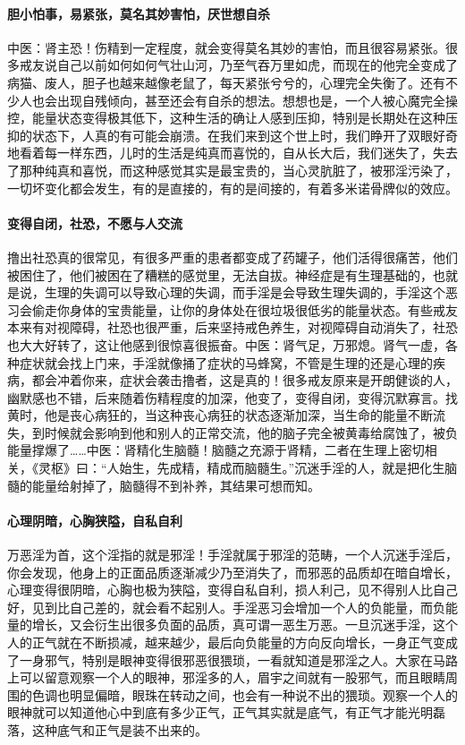 \paragraph{胆小怕事，易紧张，莫名其妙害怕，厌世想自杀}

中医：肾主恐！伤精到一定程度，就会变得莫名其妙的害怕，而且很容易紧张。很多戒友说自己以前如何如何气壮山河，乃至气吞万里如虎，而现在的他完全变成了病猫、废人，胆子也越来越像老鼠了，每天紧张兮兮的，心理完全失衡了。还有不少人也会出现自残倾向，甚至还会有自杀的想法。想想也是，一个人被心魔完全操控，能量状态变得极其低下，这种生活的确让人感到压抑，特别是长期处在这种压抑的状态下，人真的有可能会崩溃。在我们来到这个世上时，我们睁开了双眼好奇地看着每一样东西，儿时的生活是纯真而喜悦的，自从长大后，我们迷失了，失去了那种纯真和喜悦，而这种感觉其实是最宝贵的，当心灵肮脏了，被邪淫污染了，一切坏变化都会发生，有的是直接的，有的是间接的，有着多米诺骨牌似的效应。

\paragraph{变得自闭，社恐，不愿与人交流}

撸出社恐真的很常见，有很多严重的患者都变成了药罐子，他们活得很痛苦，他们被困住了，他们被困在了糟糕的感觉里，无法自拔。神经症是有生理基础的，也就是说，生理的失调可以导致心理的失调，而手淫是会导致生理失调的，手淫这个恶习会偷走你身体的宝贵能量，让你的身体处在很垃圾很低劣的能量状态。有些戒友本来有对视障碍，社恐也很严重，后来坚持戒色养生，对视障碍自动消失了，社恐也大大好转了，这让他感到很惊喜很振奋。中医：肾气足，万邪熄。肾气一虚，各种症状就会找上门来，手淫就像捅了症状的马蜂窝，不管是生理的还是心理的疾病，都会冲着你来，症状会袭击撸者，这是真的！很多戒友原来是开朗健谈的人，幽默感也不错，后来随着伤精程度的加深，他变了，变得自闭，变得沉默寡言。找黄时，他是丧心病狂的，当这种丧心病狂的状态逐渐加深，当生命的能量不断流失，到时候就会影响到他和别人的正常交流，他的脑子完全被黄毒给腐蚀了，被负能量撑爆了……中医：肾精化生脑髓！脑髓之充源于肾精，二者在生理上密切相关，《灵枢》曰：“人始生，先成精，精成而脑髓生。”沉迷手淫的人，就是把化生脑髓的能量给射掉了，脑髓得不到补养，其结果可想而知。

\paragraph{心理阴暗，心胸狭隘，自私自利}

万恶淫为首，这个淫指的就是邪淫！手淫就属于邪淫的范畴，一个人沉迷手淫后，你会发现，他身上的正面品质逐渐减少乃至消失了，而邪恶的品质却在暗自增长，心理变得很阴暗，心胸也极为狭隘，变得自私自利，损人利己，见不得别人比自己好，见到比自己差的，就会看不起别人。手淫恶习会增加一个人的负能量，而负能量的增长，又会衍生出很多负面的品质，真可谓一恶生万恶。一旦沉迷手淫，这个人的正气就在不断损减，越来越少，最后向负能量的方向反向增长，一身正气变成了一身邪气，特别是眼神变得很邪恶很猥琐，一看就知道是邪淫之人。大家在马路上可以留意观察一个人的眼神，邪淫多的人，眉宇之间就有一股邪气，而且眼睛周围的色调也明显偏暗，眼珠在转动之间，也会有一种说不出的猥琐。观察一个人的眼神就可以知道他心中到底有多少正气，正气其实就是底气，有正气才能光明磊落，这种底气和正气是装不出来的。

